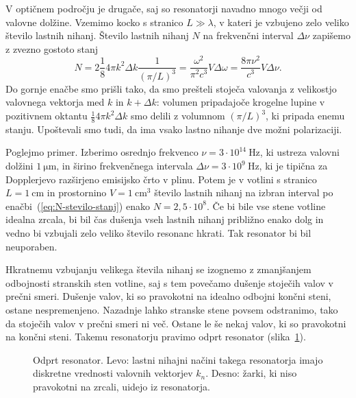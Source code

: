 V optičnem področju je drugače, saj so resonatorji navadno mnogo večji
od valovne dolžine. Vzemimo kocko s stranico $L\gg \lambda$, 
v kateri je vzbujeno zelo veliko število lastnih nihanj. Število lastnih nihanj $N$ 
na frekvenčni interval $\Delta \nu$ zapišemo z zvezno gostoto stanj
\begin{equation}
N=2 \frac{1}{8} 4\pi k^{2}\Delta k \frac{1}{(\pi/L)^3}=\frac{\omega^{2}}{\pi^{2}c^{3}}V\Delta\omega=
\frac{8\pi \nu^{2}}{c^{3}}V\Delta\nu.
\label{eq:N-stevilo-stanj}
\end{equation}
Do gornje enačbe smo prišli tako, da smo prešteli stoječa valovanja z velikostjo
valovnega vektorja med $k$ in $k+\Delta k$: volumen pripadajoče krogelne lupine v pozitivnem oktantu
$\frac{1}{8} 4\pi k^{2}\Delta k$ smo delili z volumnom $(\pi/L)^3$, ki pripada enemu stanju. 
Upoštevali smo tudi, da ima vsako lastno nihanje dve možni polarizaciji.

Poglejmo primer. Izberimo osrednjo frekvenco $\nu=3\cdot10^{14}~\si{\hertz}$, ki
ustreza valovni dolžini $1~\si{\micro\metre}$, in širino frekvenčnega
intervala $\Delta\nu=3\cdot10^{9}~\si{\hertz}$, ki je tipična za Dopplerjevo
razširjeno emisijsko črto v plinu. Potem je v votlini s stranico $L=1~\si{\centi\metre}$ 
in prostornino $V=1~\si{\centi\metre^3}$ število lastnih nihanj na izbran interval 
po enačbi~(\ref{eq:N-stevilo-stanj}) enako
$N=2,5\cdot10^{8}$. Če bi bile vse stene votline idealna zrcala,
bi bil čas dušenja vseh lastnih nihanj približno enako dolg in vedno bi vzbujali
zelo veliko število resonanc hkrati. Tak resonator bi bil neuporaben.

Hkratnemu vzbujanju velikega števila nihanj se izognemo z zmanjšanjem odbojnosti
stranskih sten votline, saj s tem povečamo dušenje stoječih valov v prečni smeri.
Dušenje valov, ki so pravokotni na idealno odbojni končni steni, ostane nespremenjeno.
Nazadnje lahko stranske stene povsem odstranimo, tako da stoječih valov v prečni smeri
ni več. Ostane le še nekaj valov, ki so pravokotni na končni
steni. Takemu resonatorju pravimo odprt resonator 
(slika~\ref{fig:Odprt_resonator}).
\begin{figure}[h]
\centering
\def\svgwidth{120truemm} 

\caption{Odprt resonator. Levo: lastni nihajni načini takega resonatorja imajo 
diskretne vrednosti valovnih vektorjev $k_{n}$. Desno: žarki, ki niso pravokotni na zrcali, 
uidejo iz resonatorja.}
\label{fig:Odprt_resonator}
\end{figure}

